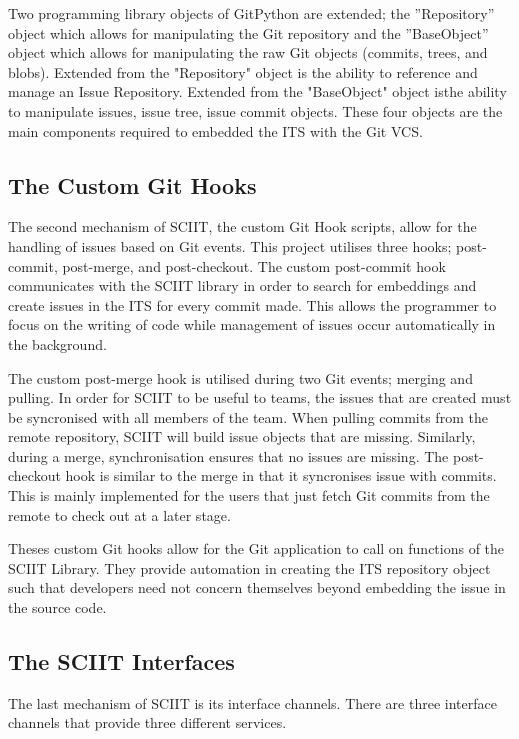 \documentclass{mproj}
\begin{document}
Two programming library objects of GitPython are extended; the ”Repository” object which allows for manipulating the Git repository and the ”BaseObject” object which allows for manipulating the raw Git objects (commits, trees, and blobs). Extended from the "Repository" object is the ability to reference and manage an Issue Repository. Extended from the "BaseObject" object isthe ability to manipulate issues, issue tree, issue commit objects. These four objects are the main components required to embedded the ITS with the Git VCS.


\subsection{The Custom Git Hooks}

The second mechanism of SCIIT, the custom Git Hook scripts, allow for the handling of issues based on Git events. This project utilises three hooks; post-commit, post-merge, and post-checkout. The custom post-commit hook communicates with the SCIIT library in order to search for embeddings and create issues in the ITS for every commit made. This allows the programmer to focus on the writing of code while management of issues occur automatically in the background. 

The custom post-merge hook is utilised during two Git events; merging and pulling. In order for SCIIT to be useful to teams, the issues that are created must be syncronised with all members of the team. When pulling commits from the remote repository, SCIIT will build issue objects that are missing. Similarly, during a merge, synchronisation ensures that no issues are missing. The post-checkout hook is similar to the merge in that it syncronises issue with commits. This is mainly implemented for the users that just fetch Git commits from the remote to check out at a later stage.

Theses custom Git hooks allow for the Git application to call on functions of the SCIIT Library. They provide automation in creating the ITS repository object such that developers need not concern themselves beyond embedding the issue in the source code. 

\subsection{The SCIIT Interfaces}

The last mechanism of SCIIT is its interface channels. There are three interface channels that provide three different services.
\end{document}
